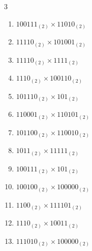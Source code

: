\begin{multicols}{3}
\begin{enumerate}
  \item $100111_{(2)} \times 11010_{(2)}$


  \item $11110_{(2)} \times 101001_{(2)}$


  \item $11110_{(2)} \times 1111_{(2)}$


  \item $1110_{(2)} \times 100110_{(2)}$


\columnbreak %

  \item $101110_{(2)} \times 101_{(2)}$


  \item $110001_{(2)} \times 110101_{(2)}$


  \item $101100_{(2)} \times 110010_{(2)}$


  \item $1011_{(2)} \times 11111_{(2)}$


  \item $100111_{(2)} \times 101_{(2)}$


\columnbreak %

\resetques

  \item $100100_{(2)} \times 100000_{(2)}$


  \item $1100_{(2)} \times 111101_{(2)}$


  \item $1110_{(2)} \times 10011_{(2)}$


  \item $111010_{(2)} \times 100000_{(2)}$


\end{enumerate}
\end{multicols}
